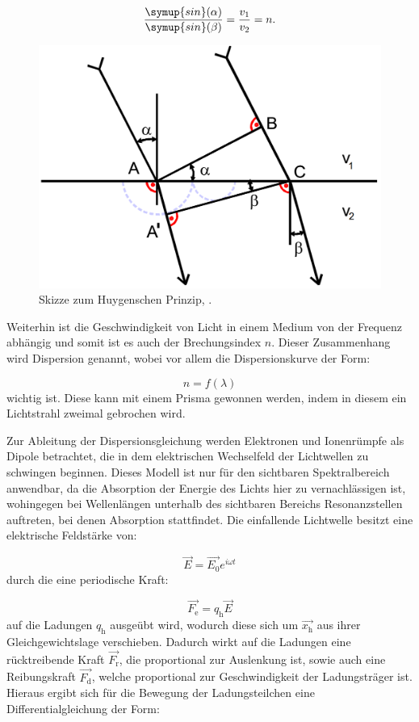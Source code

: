 \begin{equation}
\frac{\symup{sin}(\alpha)}{\symup{sin}(\beta)} = \frac{v_1}{v_2} = n.
\end{equation}

\begin{figure}[h!tbp]
	\centering
	\includegraphics[width=0.7\linewidth]{hyugens}
	\caption{Skizze zum Huygenschen Prinzip, \cite[2]{anleitungV402}.}
	\label{fig:hyugens}
\end{figure}

Weiterhin ist die Geschwindigkeit von Licht in einem Medium von der Frequenz abhängig und somit ist es auch der Brechungsindex $n$. Dieser Zusammenhang wird Dispersion genannt, wobei vor allem die Dispersionskurve der Form:

\begin{equation}
n = f(\lambda)
\end{equation}
wichtig ist. Diese kann mit einem Prisma  gewonnen werden, indem in diesem ein Lichtstrahl zweimal gebrochen wird. 

Zur Ableitung der Dispersionsgleichung werden Elektronen und Ionenrümpfe als Dipole betrachtet, die in dem elektrischen Wechselfeld der Lichtwellen zu schwingen beginnen. Dieses Modell ist nur für den sichtbaren Spektralbereich anwendbar, da die Absorption der Energie des Lichts hier zu vernachlässigen ist,
wohingegen bei Wellenlängen unterhalb des sichtbaren Bereichs Resonanzstellen auftreten, bei denen Absorption stattfindet.
Die einfallende Lichtwelle besitzt eine elektrische Feldstärke von:

\begin{equation}
\vec{E} = \vec{E_0} e^{i\omega t}
\end{equation}
durch die eine periodische Kraft:

\begin{equation}
\vec{F_{\text{e}}} = q_{\text{h}} \vec{E}
\end{equation}
auf die Ladungen $q_{\text{h}}$ ausgeübt wird, wodurch diese sich um $\vec{x_{\text{h}}}$ aus ihrer Gleichgewichtslage verschieben. Dadurch wirkt auf die Ladungen eine rücktreibende Kraft $\vec{F_{\text{r}}}$, die proportional zur Auslenkung ist, sowie auch eine Reibungskraft $\vec{F_{\text{d}}}$, welche
proportional zur Geschwindigkeit der Ladungsträger ist.
Hieraus ergibt sich für die Bewegung der Ladungsteilchen eine Differentialgleichung der Form:

